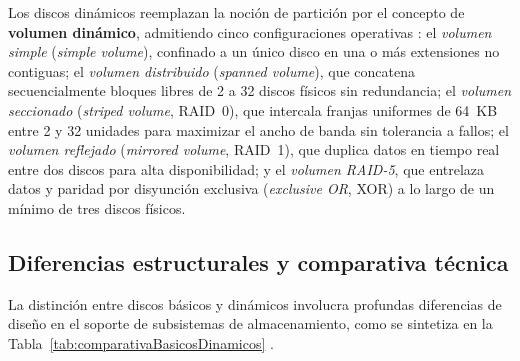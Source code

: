 \documentclass[12pt]{article}
\begin{document}
Los discos dinámicos reemplazan la noción de partición por el concepto de \textbf{volumen dinámico}, admitiendo cinco configuraciones operativas \parencite{microsoft2024basicdynamic, stallings2018operating}: el \textit{volumen simple} (\textit{simple volume}), confinado a un único disco en una o más extensiones no contiguas; el \textit{volumen distribuido} (\textit{spanned volume}), que concatena secuencialmente bloques libres de 2 a 32 discos físicos sin redundancia; el \textit{volumen seccionado} (\textit{striped volume}, RAID~0), que intercala franjas uniformes de 64~KB entre 2 y 32 unidades para maximizar el ancho de banda sin tolerancia a fallos; el \textit{volumen reflejado} (\textit{mirrored volume}, RAID~1), que duplica datos en tiempo real entre dos discos para alta disponibilidad; y el \textit{volumen RAID-5}, que entrelaza datos y paridad por disyunción exclusiva (\textit{exclusive OR}, XOR) a lo largo de un mínimo de tres discos físicos.

\subsection{Diferencias estructurales y comparativa técnica}
\label{subsec:comparativaBasicosDinamicos}

La distinción entre discos básicos y dinámicos involucra profundas diferencias de diseño en el soporte de subsistemas de almacenamiento, como se sintetiza en la Tabla~\ref{tab:comparativaBasicosDinamicos} \parencite{microsoft2024basicdynamic, stallings2018operating}.
\end{document}
